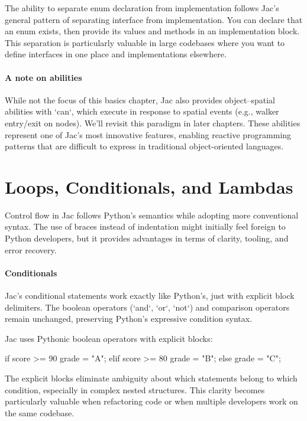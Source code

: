 The ability to separate enum declaration from implementation follows Jac's general pattern of separating interface from implementation. You can declare that an enum exists, then provide its values and methods in an implementation block. This separation is particularly valuable in large codebases where you want to define interfaces in one place and implementations elsewhere.

\paragraph{A note on abilities}

While not the focus of this basics chapter, Jac also provides object–spatial abilities with `can`, which execute in response to spatial events (e.g., walker entry/exit on nodes). We'll revisit this paradigm in later chapters. These abilities represent one of Jac's most innovative features, enabling reactive programming patterns that are difficult to express in traditional object-oriented languages.

\section{Loops, Conditionals, and Lambdas}

Control flow in Jac follows Python's semantics while adopting more conventional syntax. The use of braces instead of indentation might initially feel foreign to Python developers, but it provides advantages in terms of clarity, tooling, and error recovery.

\paragraph{Conditionals}

Jac's conditional statements work exactly like Python's, just with explicit block delimiters. The boolean operators (`and`, `or`, `not`) and comparison operators remain unchanged, preserving Python's expressive condition syntax.

Jac uses Pythonic boolean operators with explicit blocks:

\begin{jacblock}
if score >= 90 {
    grade = "A";
} elif score >= 80 {
    grade = "B";
} else {
    grade = "C";
}
\end{jacblock}

The explicit blocks eliminate ambiguity about which statements belong to which condition, especially in complex nested structures. This clarity becomes particularly valuable when refactoring code or when multiple developers work on the same codebase.


